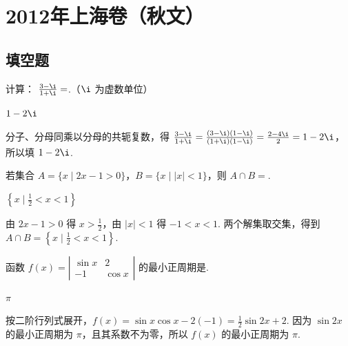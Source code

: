 \chapter{2012年上海卷（秋文）}

\section{填空题}

\begin{problem}
计算： \(\frac{3 - \i}{1 + \i} =\)\fillinblank{}.（\(\i\) 为虚数单位）
\end{problem}

\begin{answer}
\(1-2\i\)
\end{answer}

\begin{solution}
分子、分母同乘以分母的共轭复数，得 \(\frac{3-\i}{1+\i}=\frac{(3-\i)(1-\i)}{(1+\i)(1-\i)}=\frac{2-4\i}{2}=1-2\i\)，所以填 \(1-2\i\).
\end{solution}

\begin{problem}
若集合 \(A = \{x \mid 2x - 1 > 0\}\)，\(B = \{x \mid |x| < 1\}\)，则 \(A \cap B =\)\fillinblank{}.
\end{problem}

\begin{answer}
\(\left\{x \mid \frac{1}{2}<x<1\right\}\)
\end{answer}

\begin{solution}
由 \(2x-1>0\) 得 \(x>\frac{1}{2}\)，由 \(|x|<1\) 得 \(-1<x<1\). 两个解集取交集，得到 \(A\cap B=\left\{x\mid \frac{1}{2}<x<1\right\}\).
\end{solution}

\begin{problem}
函数 \( f(x) = \left| \begin{matrix} \sin x & 2 \\ -1 & \cos x \end{matrix} \right| \) 的最小正周期是\fillinblank{}.
\end{problem}

\begin{answer}
\(\pi\)
\end{answer}

\begin{solution}
按二阶行列式展开，\(f(x)=\sin x\cos x-2(-1)=\frac{1}{2}\sin 2x+2\). 因为 \(\sin 2x\) 的最小正周期为 \(\pi\)，且其系数不为零，所以 \(f(x)\) 的最小正周期为 \(\pi\).
\end{solution}

